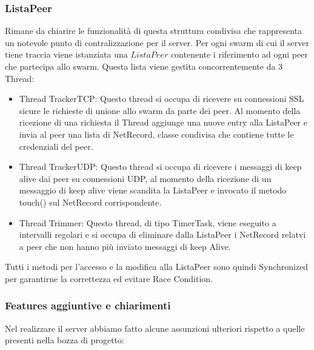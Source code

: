\subsubsection{ListaPeer}

Rimane da chiarire le funzionalit\`a di questa struttura condivisa che rappresenta un notevole punto di contralizzazione per il server.
Per ogni swarm di cui il server tiene traccia viene istanziata una $ListaPeer$ contenente i riferimento ad ogni peer che partecipa allo swarm. Questa lista viene gestita concorrentemente da 3 Thread:

\begin{itemize}
\item Thread TrackerTCP: Questo thread si occupa di ricevere su connessioni SSL sicure le richieste di unione allo swarm da parte dei peer. Al momento della ricezione di una richiesta il Thread aggiunge una nuove entry alla ListaPeer e invia al peer una lista di NetRecord, classe condivisa che contiene tutte le credenziali del peer.
\item Thread TrackerUDP: Questo thread si occupa di ricevere i messaggi di keep alive dai peer su connessioni UDP, al momento della ricezione di un messaggio di keep alive viene scandita la ListaPeer e invocato il metodo touch() sul NetRecord corrispondente.
\item Thread Trimmer: Questo thread, di tipo TimerTask, viene eseguito a intervalli regolari e si occupa di eliminare dalla ListaPeer i NetRecord relatvi a peer che non hanno pi\`u inviato messaggi di keep Alive.
\end{itemize}

Tutti i metodi per l'accesso e la modifica alla ListaPeer sono quindi Synchronized per garantirne la correttezza ed evitare Race Condition.

\subsubsection{Features aggiuntive e chiarimenti}

Nel realizzare il server abbiamo fatto alcune assunzioni ulteriori rispetto a quelle presenti nella bozza di progetto:

